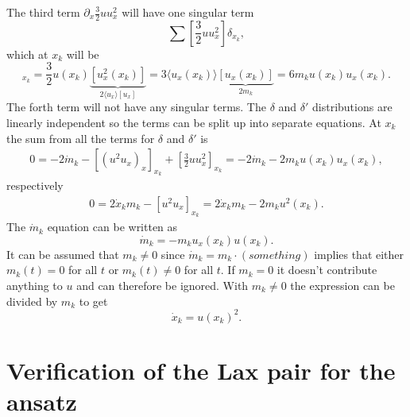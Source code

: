 \documentclass[english,master]{liumaiex}
\theoremstyle{plain}
\theoremstyle{definition}
\begin{document}
The third term $\partial_x \frac{3}{2}u u_x^2$ will have one singular term
\begin{equation}
	\sum [\frac{3}{2} u u_x^2] \delta_{x_k},
\end{equation}
which at $x_k$ will be
\begin{equation}
	[\frac{3}{2}u u_x^2]_{x_k} = \frac{3}{2}u(x_k) \underbrace{[u_x^2(x_k)]}_{2\langle u_x \rangle [u_x]} = 3 \langle u_x(x_k) \rangle \underbrace{[u_x(x_k)]}_{2m_k} = 6m_k u(x_k) u_x(x_k).
\end{equation}
%
The forth term will not have any singular terms. The $\delta$ and $\delta'$ distributions are linearly independent so the terms can be split up into separate equations. At $x_k$ the sum from all the terms for $\delta$ and $\delta'$ is
\begin{equation}
\begin{aligned}
	0 = -2 \dot{m}_k - [(u^2u_x)_x]_{x_k} + [\frac{3}{2}uu_x^2]_{x_k} = -2 \dot{m}_k - 2 m_k u(x_k) u_x(x_k),
\end{aligned}
\end{equation}
respectively
\begin{equation}
\begin{aligned}
	0 = 2 \dot{x}_k m_k - [u^2u_x]_{x_k} = 2 \dot{x}_k m_k - 2m_ku^2(x_k).
\end{aligned}
\end{equation}
%
The $\dot{m}_k$ equation can be written as
\begin{equation}
	\dot{m}_k = -m_ku_x(x_k)u(x_k).
\end{equation}
It can be assumed that $m_k \neq 0$ since $\dot{m}_k = m_k \cdot (something)$ implies that either $m_k(t) = 0$ for all $t$ or $m_k(t) \neq 0$ for all $t$. If $m_k = 0$ it doesn't contribute anything to $u$ and can therefore be ignored. With $m_k \neq 0$ the expression can be divided by $m_k$ to get
\begin{equation}
	\dot{x}_k = u(x_k)^2.
\end{equation}

\section{Verification of the Lax pair for the ansatz}
\end{document}

